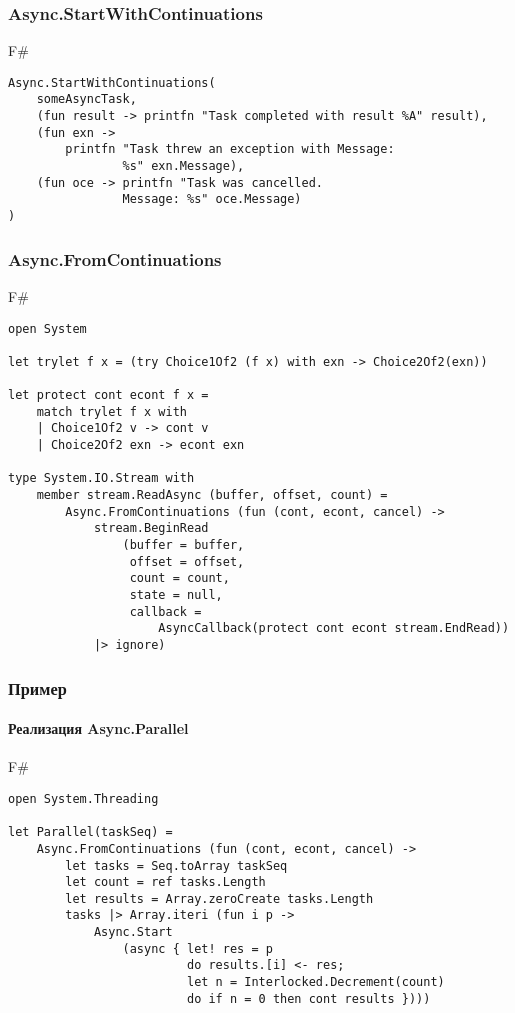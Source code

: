 \documentclass[xetex,mathserif,serif]{beamer}
\begin{document}
	\begin{frame}[fragile]
		\frametitle{Async.StartWithContinuations}
   		\begin{exampleblock}{F\#}
   			\begin{lstlisting}
Async.StartWithContinuations(
    someAsyncTask,
    (fun result -> printfn "Task completed with result %A" result),
    (fun exn -> 
        printfn "Task threw an exception with Message: 
                %s" exn.Message),
    (fun oce -> printfn "Task was cancelled. 
                Message: %s" oce.Message)
)
\end{lstlisting}
\end{exampleblock}
\end{frame}

	\begin{frame}[fragile]
		\frametitle{Async.FromContinuations}
   		\begin{exampleblock}{F\#}
   			\begin{lstlisting}[basicstyle=\scriptsize]
open System

let trylet f x = (try Choice1Of2 (f x) with exn -> Choice2Of2(exn))

let protect cont econt f x =
    match trylet f x with
    | Choice1Of2 v -> cont v
    | Choice2Of2 exn -> econt exn

type System.IO.Stream with
    member stream.ReadAsync (buffer, offset, count) =
        Async.FromContinuations (fun (cont, econt, cancel) ->
            stream.BeginRead
                (buffer = buffer,
                 offset = offset,
                 count = count,
                 state = null,
                 callback = 
                     AsyncCallback(protect cont econt stream.EndRead))
            |> ignore)
\end{lstlisting}
\end{exampleblock}
\end{frame}

	\begin{frame}[fragile]
		\frametitle{Пример}
		\framesubtitle{Реализация Async.Parallel}
   		\begin{exampleblock}{F\#}
   			\begin{lstlisting}[basicstyle=\footnotesize]
open System.Threading   			

let Parallel(taskSeq) =
    Async.FromContinuations (fun (cont, econt, cancel) ->
        let tasks = Seq.toArray taskSeq
        let count = ref tasks.Length
        let results = Array.zeroCreate tasks.Length
        tasks |> Array.iteri (fun i p ->
            Async.Start
                (async { let! res = p
                         do results.[i] <- res;
                         let n = Interlocked.Decrement(count)
                         do if n = 0 then cont results })))
\end{lstlisting}
\end{exampleblock}
\end{frame}
\end{document}
